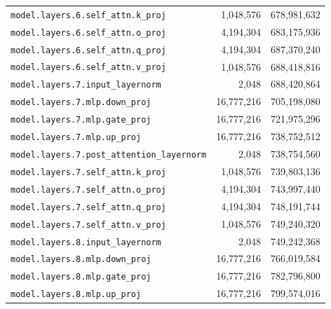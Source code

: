 \documentclass[10pt,a4paper]{article}
\begin{document}
\begin{appendices}
\begin{longtable}{p{9.5cm}rr}
\texttt{model.\allowbreak{}layers.\allowbreak{}6.\allowbreak{}self\_attn.\allowbreak{}k\_proj} & 1,048,576 & 678,981,632 \\
\texttt{model.\allowbreak{}layers.\allowbreak{}6.\allowbreak{}self\_attn.\allowbreak{}o\_proj} & 4,194,304 & 683,175,936 \\
\texttt{model.\allowbreak{}layers.\allowbreak{}6.\allowbreak{}self\_attn.\allowbreak{}q\_proj} & 4,194,304 & 687,370,240 \\
\texttt{model.\allowbreak{}layers.\allowbreak{}6.\allowbreak{}self\_attn.\allowbreak{}v\_proj} & 1,048,576 & 688,418,816 \\
\texttt{model.\allowbreak{}layers.\allowbreak{}7.\allowbreak{}input\_layernorm} & 2,048 & 688,420,864 \\
\texttt{model.\allowbreak{}layers.\allowbreak{}7.\allowbreak{}mlp.\allowbreak{}down\_proj} & 16,777,216 & 705,198,080 \\
\texttt{model.\allowbreak{}layers.\allowbreak{}7.\allowbreak{}mlp.\allowbreak{}gate\_proj} & 16,777,216 & 721,975,296 \\
\texttt{model.\allowbreak{}layers.\allowbreak{}7.\allowbreak{}mlp.\allowbreak{}up\_proj} & 16,777,216 & 738,752,512 \\
\texttt{model.\allowbreak{}layers.\allowbreak{}7.\allowbreak{}post\_attention\_layernorm} & 2,048 & 738,754,560 \\
\texttt{model.\allowbreak{}layers.\allowbreak{}7.\allowbreak{}self\_attn.\allowbreak{}k\_proj} & 1,048,576 & 739,803,136 \\
\texttt{model.\allowbreak{}layers.\allowbreak{}7.\allowbreak{}self\_attn.\allowbreak{}o\_proj} & 4,194,304 & 743,997,440 \\
\texttt{model.\allowbreak{}layers.\allowbreak{}7.\allowbreak{}self\_attn.\allowbreak{}q\_proj} & 4,194,304 & 748,191,744 \\
\texttt{model.\allowbreak{}layers.\allowbreak{}7.\allowbreak{}self\_attn.\allowbreak{}v\_proj} & 1,048,576 & 749,240,320 \\
\texttt{model.\allowbreak{}layers.\allowbreak{}8.\allowbreak{}input\_layernorm} & 2,048 & 749,242,368 \\
\texttt{model.\allowbreak{}layers.\allowbreak{}8.\allowbreak{}mlp.\allowbreak{}down\_proj} & 16,777,216 & 766,019,584 \\
\texttt{model.\allowbreak{}layers.\allowbreak{}8.\allowbreak{}mlp.\allowbreak{}gate\_proj} & 16,777,216 & 782,796,800 \\
\texttt{model.\allowbreak{}layers.\allowbreak{}8.\allowbreak{}mlp.\allowbreak{}up\_proj} & 16,777,216 & 799,574,016 \\

\end{longtable}
\end{appendices}
\end{document}
